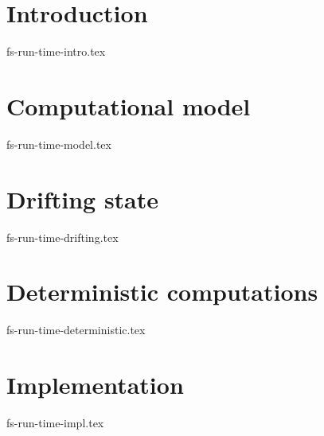 \documentclass[14pt]{matmex-diploma-custom}
\theoremstyle{remark}
\begin{document}

\section* {Introduction}
 {fs-run-time-intro.tex}

\section {Computational model}
 {fs-run-time-model.tex}

\section{Drifting state}
 {fs-run-time-drifting.tex}

\section {Deterministic computations}
 {fs-run-time-deterministic.tex}

\section {Implementation}
 {fs-run-time-impl.tex}
\end{document}
